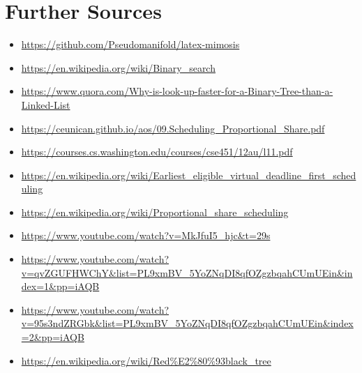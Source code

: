 \documentclass{mimosis}
\begin{document}
          \section*{Further Sources}
          \begin{itemize}
            \item \url{https://github.com/Pseudomanifold/latex-mimosis}
            \item \url{https://en.wikipedia.org/wiki/Binary_search}
            \item \url{https://www.quora.com/Why-is-look-up-faster-for-a-Binary-Tree-than-a-Linked-List}
            \item \url{https://ceunican.github.io/aos/09.Scheduling_Proportional_Share.pdf}
            \item \url{https://courses.cs.washington.edu/courses/cse451/12au/l11.pdf}
            \item \url{https://en.wikipedia.org/wiki/Earliest_eligible_virtual_deadline_first_scheduling}
            \item \url{https://en.wikipedia.org/wiki/Proportional_share_scheduling}
            \item \url{https://www.youtube.com/watch?v=MkJfuI5_hjc&t=29s}
            \item \url{https://www.youtube.com/watch?v=qvZGUFHWChY&list=PL9xmBV_5YoZNqDI8qfOZgzbqahCUmUEin&index=1&pp=iAQB}
            \item \url{https://www.youtube.com/watch?v=95s3ndZRGbk&list=PL9xmBV_5YoZNqDI8qfOZgzbqahCUmUEin&index=2&pp=iAQB}
            \item \url{https://en.wikipedia.org/wiki/Red%E2%80%93black_tree} 
          \end{itemize}


          
\end{document}
